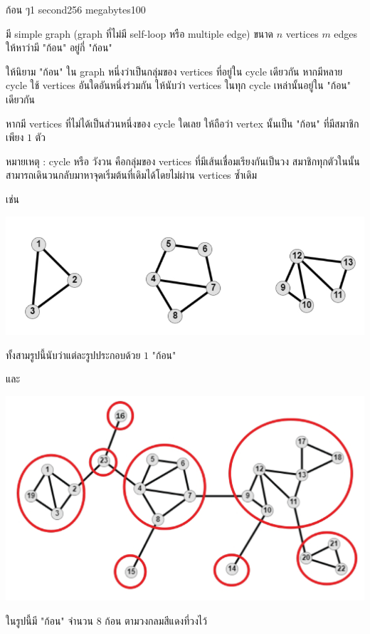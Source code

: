 \documentclass[11pt,a4paper]{article}
\begin{document}
 
\begin{problem}{ก้อน ๆ}{}{}{1 second}{256 megabytes}{100}

มี simple graph (graph ที่ไม่มี self-loop หรือ multiple edge) ขนาด $n$ vertices $m$ edges ให้หาว่ามี "ก้อน" อยู่กี่ "ก้อน"

ให้นิยาม "ก้อน" ใน graph หนึ่งว่าเป็นกลุ่มของ vertices ที่อยู่ใน cycle เดียวกัน หากมีหลาย cycle ใช้ vertices อันใดอันหนึ่งร่วมกัน ให้นับว่า vertices ในทุก cycle เหล่านั้นอยู่ใน "ก้อน" เดียวกัน

หากมี vertices ที่ไม่ได้เป็นส่วนหนึ่งของ cycle ใดเลย ให้ถือว่า vertex นั้นเป็น "ก้อน" ที่มีสมาชิกเพียง $1$ ตัว

หมายเหตุ : cycle หรือ วังวน คือกลุ่มของ vertices ที่มีเส้นเชื่อมเรียงกันเป็นวง สมาชิกทุกตัวในนั้นสามารถเดินวนกลับมาหาจุดเริ่มต้นที่เดิมได้โดยไม่ผ่าน vertices ซ้ำเดิม

เช่น

 \includegraphics[width=\textwidth]{09-chunk-in-graph/1.jpg}

ทั้งสามรูปนี้นับว่าแต่ละรูปประกอบด้วย $1$ "ก้อน"

และ 

 \includegraphics[width=\textwidth]{09-chunk-in-graph/2.jpg}

ในรูปนี้มี "ก้อน" จำนวน $8$ ก้อน ตามวงกลมสีแดงที่วงไว้

\InputFile


\end{problem}
\end{document}
